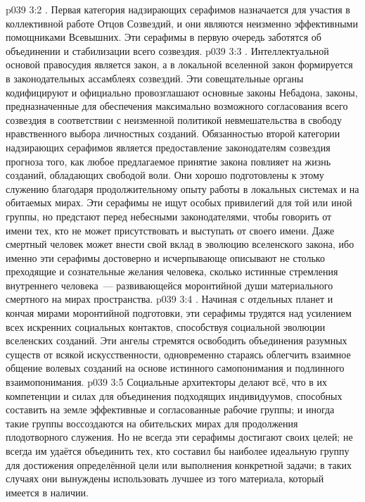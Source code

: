 \vs p039 3:2 . Первая категория надзирающих серафимов назначается для участия в коллективной работе Отцов Созвездий, и они являются неизменно эффективными помощниками Всевышних. Эти серафимы в первую очередь заботятся об объединении и стабилизации всего созвездия.
\vs p039 3:3 . Интеллектуальной основой правосудия является закон, а в локальной вселенной закон формируется в законодательных ассамблеях созвездий. Эти совещательные органы кодифицируют и официально провозглашают основные законы Небадона, законы, предназначенные для обеспечения максимально возможного согласования всего созвездия в соответствии с неизменной политикой невмешательства в свободу нравственного выбора личностных созданий. Обязанностью второй категории надзирающих серафимов является предоставление законодателям созвездия прогноза того, как любое предлагаемое принятие закона повлияет на жизнь созданий, обладающих свободой воли. Они хорошо подготовлены к этому служению благодаря продолжительному опыту работы в локальных системах и на обитаемых мирах. Эти серафимы не ищут особых привилегий для той или иной группы, но предстают перед небесными законодателями, чтобы говорить от имени тех, кто не может присутствовать и выступать от своего имени. Даже смертный человек может внести свой вклад в эволюцию вселенского закона, ибо именно эти серафимы достоверно и исчерпывающе описывают не столько преходящие и сознательные желания человека, сколько истинные стремления внутреннего человека~--- развивающейся моронтийной души материального смертного на мирах пространства.
\vs p039 3:4 . Начиная с отдельных планет и кончая мирами моронтийной подготовки, эти серафимы трудятся над усилением всех искренних социальных контактов, способствуя социальной эволюции вселенских созданий. Эти ангелы стремятся освободить объединения разумных существ от всякой искусственности, одновременно стараясь облегчить взаимное общение волевых созданий на основе истинного самопонимания и подлинного взаимопонимания.
\vs p039 3:5 Социальные архитекторы делают всё, что в их компетенции и силах для объединения подходящих индивидуумов, способных составить на земле эффективные и согласованные рабочие группы; и иногда такие группы воссоздаются на обительских мирах для продолжения плодотворного служения. Но не всегда эти серафимы достигают своих целей; не всегда им удаётся объединить тех, кто составил бы наиболее идеальную группу для достижения определённой цели или выполнения конкретной задачи; в таких случаях они вынуждены использовать лучшее из того материала, который имеется в наличии.
